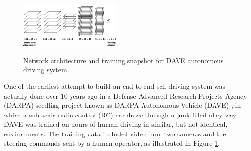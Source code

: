 \documentclass[twoside]{article}
\begin{document}
\begin{figure}[!htp]
\centering
\hfill
{}
{\includegraphics[width=0.45\textwidth]{img/DAVE_network.png}}%
\hfill
{}
\caption{Network architecture and training snapshot for DAVE\cite{lecun2004dave} autonomous driving system.}
\label{fig:dave}
\end{figure}


One of the earliest attempt to build an end-to-end self-driving system was actually done over 10 years ago in a Defense Advanced Research Projects Agency (DARPA) seedling project known as DARPA Autonomous Vehicle (DAVE)
\cite{lecun2004dave}, in which a sub-scale radio control (RC) car drove through a junk-filled alley way. DAVE was trained on hours of human driving in similar, but not identical, environments. The training data included video from two cameras and the steering commands sent by a human operator, as illustrated in Figure \ref{fig:dave}.
\end{document}
